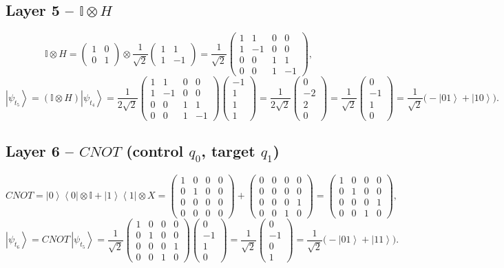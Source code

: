 \documentclass[11pt,a4paper]{article}
\newcommand{\ket}[1]{\left|#1\right\rangle}
\newcommand{\bra}[1]{\left\langle#1\right|}
\newcommand{\psit}[1]{\ket{\psi_{t_{#1}}}}
\newcommand{\IH}{\begin{pmatrix} 1 & 1 & 0 & 0\\ 1 & -1 & 0 & 0\\ 0 & 0 & 1 & 1\\ 0 & 0 & 1 & -1 \end{pmatrix}}
\newcommand{\CX}{\begin{pmatrix} 1 & 0 & 0 & 0\\ 0 & 1 & 0 & 0\\ 0 & 0 & 0 & 1\\ 0 & 0 & 1 & 0 \end{pmatrix}}
\begin{document}
\subsection*{Layer 5 -- $\mathbb{I}\otimes H$}
\[
\mathbb{I}\otimes H = \begin{pmatrix}1&0\\0&1\end{pmatrix}\otimes\frac{1}{\sqrt2}\begin{pmatrix}1&1\\1&-1\end{pmatrix}
= \frac{1}{\sqrt2}\IH,
\]
\[
\psit{5} = (\mathbb{I}\otimes H)\psit{4} = \frac{1}{2\sqrt2}\IH\begin{pmatrix}-1\\1\\1\\1\end{pmatrix}
= \frac{1}{2\sqrt2}\begin{pmatrix}0\\-2\\2\\0\end{pmatrix}
= \frac{1}{\sqrt2}\begin{pmatrix}0\\-1\\1\\0\end{pmatrix}
= \frac{1}{\sqrt2}\big(-\ket{01}+\ket{10}\big).
\]

\subsection*{Layer 6 -- $CNOT$ (control $q_0$, target $q_1$)}
\[
CNOT = \ket{0}\bra{0}\otimes\mathbb{I} + \ket{1}\bra{1}\otimes X
= \begin{pmatrix}1&0&0&0\\0&1&0&0\\0&0&0&0\\0&0&0&0\end{pmatrix}
+ \begin{pmatrix}0&0&0&0\\0&0&0&0\\0&0&0&1\\0&0&1&0\end{pmatrix}
= \CX,
\]
\[
\psit{6} = CNOT\,\psit{5} = \frac{1}{\sqrt2}\CX\begin{pmatrix}0\\-1\\1\\0\end{pmatrix}
= \frac{1}{\sqrt2}\begin{pmatrix}0\\-1\\0\\1\end{pmatrix}
= \frac{1}{\sqrt2}\big(-\ket{01}+\ket{11}\big).
\]
\end{document}

